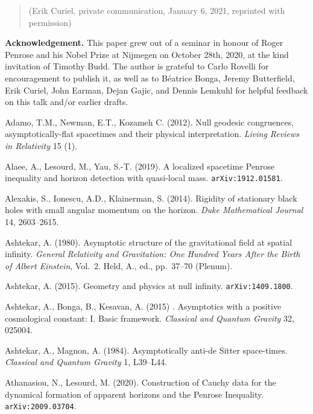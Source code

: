 \documentclass[12pt]{article}
\begin{document}
\begin{quote}
\begin{small}
(Erik Curiel, private communication, January 6, 2021, reprinted with permission)
\end{small}
\end{quote}
\newpage

\noindent \textbf{Acknowledgement.} This paper grew out of a seminar in honour of Roger Penrose and his Nobel Prize at Nijmegen on October 28th, 2020, at the kind invitation of Timothy Budd. The author is grateful to Carlo Rovelli for encouragement to publish it, as well as to B\'{e}atrice Bonga, Jeremy Butterfield, Erik Curiel, John Earman,  Dejan Gajic, and Dennis Lemkuhl for helpful feedback on this talk and/or earlier drafts.
\smallskip

\begin{small}
\raggedright
\begin{thebibliography}{99}
\item[]  Adamo, T.M.,  Newman, E.T.,  Kozameh C. (2012). Null geodesic congruences, asymptotically-flat spacetimes and their physical interpretation.  \emph{Living Reviews in Relativity} 15 (1).
\item[]  Alaee, A.,  Lesourd, M., Yau, S.-T. (2019). A localized spacetime Penrose inequality and horizon detection with quasi-local mass. \texttt{arXiv:1912.01581}. 
\item[]  Alexakis, S.,  Ionescu, A.D.,  Klainerman, S. (2014). Rigidity of stationary black holes with small angular momentum on the horizon. \emph{Duke Mathematical Journal}  14, 2603--2615.
\item[] Ashtekar, A. (1980). Asymptotic structure of the gravitational field at spatial infinity.
 \emph{General Relativity and Gravitation: One Hundred Years After the Birth of Albert Einstein}, Vol.\ 2.
 Held, A., ed., pp.\ 37--70 (Plenum). 
\item[] Ashtekar, A. (2015). Geometry and physics at null infinity. \texttt{arXiv:1409.1800}.
 \item[]  Ashtekar, A.,  Bonga, B., Kesavan, A.  (2015) . Asymptotics with a positive cosmological constant: I. Basic framework. \emph{Classical and Quantum Gravity} 32, 025004. 
  \item[]  Ashtekar, A.,   Magnon, A. (1984). 
  Asymptotically anti-de Sitter space-times.  \emph{Classical and Quantum Gravity} 1, L39--L44. 
\item[]   Athanasiou, N.,  Lesourd, M. (2020).  Construction of Cauchy data for the dynamical formation of apparent horizons and the Penrose Inequality. \texttt{arXiv:2009.03704}.

\end{thebibliography}
\end{small}
\end{document}
